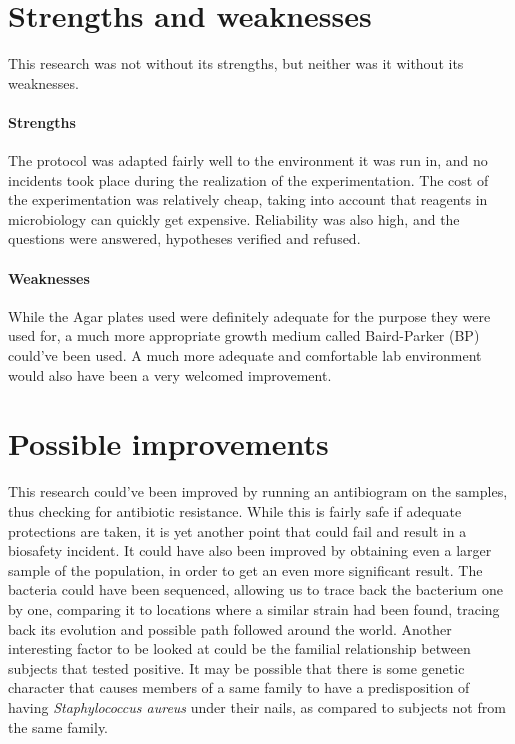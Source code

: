 \section{Strengths and weaknesses}
This research was not without its strengths, but neither was it without its weaknesses.
\paragraph{Strengths} The protocol was adapted fairly well to the environment it was run in, and no incidents took place during the realization of the experimentation. The cost of the experimentation was relatively cheap, taking into account that reagents in microbiology can quickly get expensive. Reliability was also high, and the questions were answered, hypotheses verified and refused.
\paragraph{Weaknesses} While the Agar plates used were definitely adequate for the purpose they were used for, a much more appropriate growth medium called Baird-Parker (BP) could've been used. A much more adequate and comfortable lab environment would also have been a very welcomed improvement.
\section{Possible improvements}
This research could've been improved by running an antibiogram on the samples, thus checking for antibiotic resistance. While this is fairly safe if adequate protections are taken, it is yet another point that could fail and result in a biosafety incident.\newline
It could have also been improved by obtaining even a larger sample of the population, in order to get an even more significant result. The bacteria could have been sequenced, allowing us to trace back the bacterium one by one, comparing it to locations where a similar strain had been found, tracing back its evolution and possible path followed around the world.\newline
Another interesting factor to be looked at could be the familial relationship between subjects that tested positive. It may be possible that there is some genetic character that causes members of a same family to have a predisposition of having \emph{Staphylococcus aureus} under their nails, as compared to subjects not from the same family.
